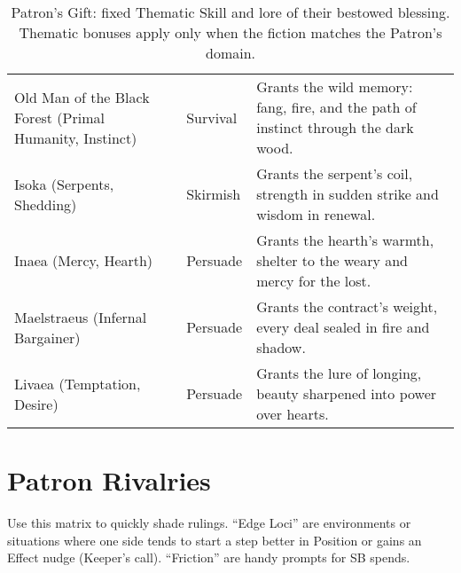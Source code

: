 \begin{table}[H]
\begin{tabular}{@{}p{3.8cm}p{3.8cm}p{7.5cm}@{}}
Old Man of the Black Forest (Primal Humanity, Instinct) & Survival & Grants the wild memory: fang, fire, and the path of instinct through the dark wood. \\
Isoka (Serpents, Shedding) & Skirmish & Grants the serpent’s coil, strength in sudden strike and wisdom in renewal. \\
Inaea (Mercy, Hearth) & Persuade & Grants the hearth’s warmth, shelter to the weary and mercy for the lost. \\
Maelstraeus (Infernal Bargainer) & Persuade & Grants the contract’s weight, every deal sealed in fire and shadow. \\
Livaea (Temptation, Desire) & Persuade & Grants the lure of longing, beauty sharpened into power over hearts. \\
\bottomrule
\end{tabular}
\caption{Patron’s Gift: fixed Thematic Skill and lore of their bestowed blessing. Thematic bonuses apply only when the fiction matches the Patron’s domain.}
\label{tab:gift-thematic-map}
\end{table}


\section*{Patron Rivalries}
\label{app:patron-rivalries}

Use this matrix to quickly shade rulings. “Edge Loci” are environments or situations where one side tends to start a step better in Position or gains an Effect nudge (Keeper’s call). “Friction” are handy prompts for SB spends.

\renewcommand{\arraystretch}{1.15}
\setlength{\LTpre}{0pt}
\setlength{\LTpost}{0pt}

